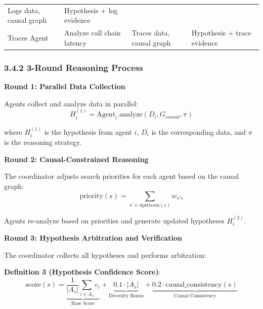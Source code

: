 \begin{longtable}[]{@{}llll@{}}
\begin{minipage}[t]{0.16\columnwidth}
Logs data, causal graph\strut
\end{minipage} & \begin{minipage}[t]{0.18\columnwidth}\raggedright
Hypothesis + log evidence\strut
\end{minipage}\tabularnewline
\begin{minipage}[t]{0.14\columnwidth}\raggedright
Traces Agent\strut
\end{minipage} & \begin{minipage}[t]{0.41\columnwidth}\raggedright
Analyze call chain latency\strut
\end{minipage} & \begin{minipage}[t]{0.16\columnwidth}\raggedright
Traces data, causal graph\strut
\end{minipage} & \begin{minipage}[t]{0.18\columnwidth}\raggedright
Hypothesis + trace evidence\strut
\end{minipage}\tabularnewline
\bottomrule
\end{longtable}

\hypertarget{round-reasoning-process}{%
\subsubsection{3.4.2 3-Round Reasoning
Process}\label{round-reasoning-process}}

\textbf{Round 1: Parallel Data Collection}

Agents collect and analyze data in parallel:
\[H_i^{(1)} = \text{Agent}_i.\text{analyze}(D_i, G_{causal}, \pi)\]

where \(H_i^{(1)}\) is the hypothesis from agent \(i\), \(D_i\) is the
corresponding data, and \(\pi\) is the reasoning strategy.

\textbf{Round 2: Causal-Constrained Reasoning}

The coordinator adjusts search priorities for each agent based on the
causal graph:
\[\text{priority}(s) = \sum_{s' \in \text{upstream}(s)} w_{s's}\]

Agents re-analyze based on priorities and generate updated hypotheses
\(H_i^{(2)}\).

\textbf{Round 3: Hypothesis Arbitration and Verification}

The coordinator collects all hypotheses and performs arbitration:

\textbf{Definition 3 (Hypothesis Confidence Score)}:
\[\text{score}(s) = \underbrace{\frac{1}{|A_s|}\sum_{i \in A_s} c_i}_{\text{Base Score}} + \underbrace{0.1 \cdot |A_s|}_{\text{Diversity Bonus}} + \underbrace{0.2 \cdot \text{causal\_consistency}(s)}_{\text{Causal Consistency}}\]

